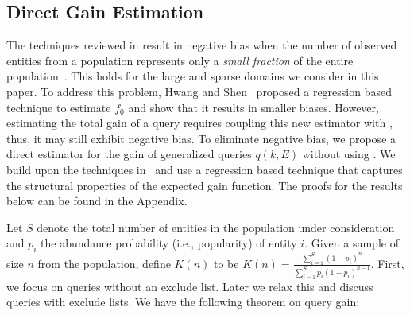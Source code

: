 \subsection{Direct Gain Estimation}
\label{sec:newestim}
The techniques reviewed in  result in negative bias when the number of observed entities from a population represents only a {\em small fraction} of the entire population~\cite{hwang:2010, shen:2003}. This holds for the large and sparse domains we consider in this paper. To address this problem, Hwang and Shen~\cite{hwang:2010} proposed a regression based technique to estimate $f_0$ and show that it results in smaller biases. However, estimating the total gain of a query requires coupling this new estimator with , thus, it may still exhibit negative bias. To eliminate negative bias, we propose a direct estimator for the gain of generalized queries $q(k,E)$ without using . We build upon the techniques in~\cite{hwang:2010} and use a regression based technique that captures the structural properties of the expected gain function. The proofs for the results below can be found in the Appendix.

Let $S$ denote the total number of entities in the population under consideration and $p_i$ the abundance probability (i.e., popularity) of entity $i$. Given a sample of size $n$ from the population, define $K(n)$ to be $K(n) = \frac{\sum_{i=1}^S (1-p_i)^n}{\sum_{i=1}^S p_i(1-p_i)^{n-1}}$. First, we focus on queries without an exclude list. Later we relax this and discuss queries with exclude lists. We have the following theorem on query gain:

